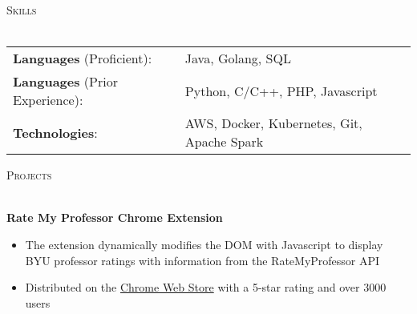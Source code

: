 \documentclass[letterpaper]{article}
\newcommand{\lineunder} {
    \vspace*{-8pt} \\
    \hspace*{-18pt} \hrulefill \\
}
\newcommand{\header} [1] {
    {\hspace*{-18pt}\vspace*{6pt} \textsc{#1}}
    \vspace*{-6pt} \lineunder
    \vspace{1mm}
}
\begin{document}
\header{Skills}

\begin{tabular}{ l l}
    \vspace{2mm}
	\textbf{Languages} (Proficient): & Java, Golang, SQL \\
    \vspace{2mm}
    \textbf{Languages} (Prior Experience):& Python, C/C++, PHP, Javascript \\
	\textbf{Technologies}: & AWS, Docker, Kubernetes, Git, Apache Spark  \\
\end{tabular}
\vspace{2mm}

\header{Projects}

\textbf{Rate My Professor Chrome Extension} \\
\vspace{-1mm}
\begin{itemize} \itemsep 1pt
	\item The extension dynamically modifies the DOM with Javascript to display BYU professor ratings with information from the RateMyProfessor API
	\item Distributed on the \href{https://chrome.google.com/webstore/detail/rate-my-byu-professors/ghokpcnkghnkfofadiajmmhinooijmaf}{Chrome Web Store} with a 5-star rating and over 3000 users
\end{itemize}
\vspace*{2mm}

\ 
\end{document}
